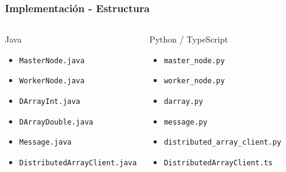 \documentclass{beamer}
\begin{document}
\begin{frame}
\frametitle{Implementación - Estructura}
\begin{columns}
\begin{block}{Java}
    \begin{itemize}
        \item<1-> \texttt{MasterNode.java}
        \item<2-> \texttt{WorkerNode.java}
        \item<3-> \texttt{DArrayInt.java}
        \item<3-> \texttt{DArrayDouble.java}
        \item<4-> \texttt{Message.java}
        \item<5-> \texttt{DistributedArrayClient.java}
    \end{itemize}
\end{block}

\begin{block}{Python / TypeScript}
    \begin{itemize}
        \item<1-> \texttt{master\_node.py}
        \item<2-> \texttt{worker\_node.py}
        \item<3-> \texttt{darray.py}
        \item<4-> \texttt{message.py}
        \item<5-> \texttt{distributed\_array\_client.py}
        \item<6-> \texttt{DistributedArrayClient.ts}
    \end{itemize}
\end{block}
\end{columns}
\end{frame}
\end{document}
